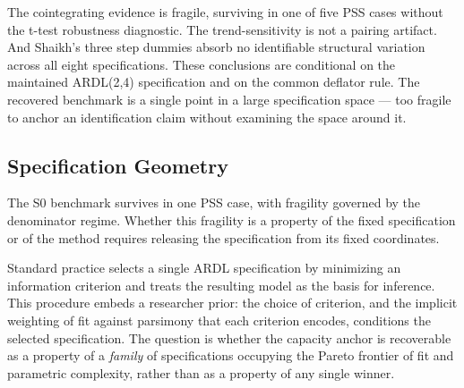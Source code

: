 \documentclass[11pt,a4paper]{article}
\begin{document}
The cointegrating evidence is fragile, surviving in one of five PSS cases
without the t-test robustness diagnostic. The trend-sensitivity is not a
pairing artifact. And Shaikh's three step dummies absorb no identifiable
structural variation across all eight specifications. These conclusions are
conditional on the maintained ARDL(2,4) specification and on the common
deflator rule. The recovered benchmark is a single point in a large
specification space --- too fragile to anchor an identification claim without
examining the space around it.



\subsection{Specification Geometry}
\label{sec:S1}


The S0 benchmark survives in one PSS case, with fragility governed by the
denominator regime. Whether this fragility is a property of the fixed
specification or of the method requires releasing the specification from its
fixed coordinates.

Standard practice selects a single ARDL specification by minimizing an
information criterion and treats the resulting model as the basis for
inference. This procedure embeds a researcher prior: the choice of
criterion, and the implicit weighting of fit against parsimony that each
criterion encodes, conditions the selected specification. The question is
whether the capacity anchor is recoverable as a property of a \emph{family}
of specifications occupying the Pareto frontier of fit and parametric
complexity, rather than as a property of any single winner.
\end{document}
